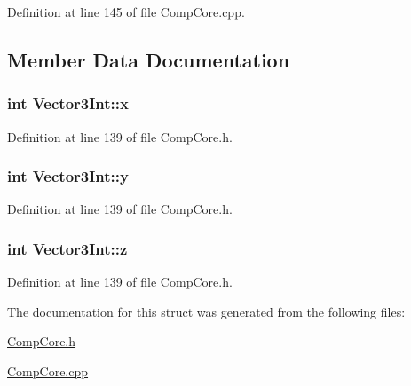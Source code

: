 Definition at line 145 of file Comp\-Core.\-cpp.



\subsection{Member Data Documentation}
\hypertarget{struct_vector3_int_a8d4ba1800a1912105d9089b54927b3cd}{
\subsubsection[{x}]{\setlength{\rightskip}{0pt plus 5cm}int Vector3\-Int\-::x}}\label{struct_vector3_int_a8d4ba1800a1912105d9089b54927b3cd}


Definition at line 139 of file Comp\-Core.\-h.

\hypertarget{struct_vector3_int_a6d6fcbb9ba302ed0dc3b7ac2752397b3}{
\subsubsection[{y}]{\setlength{\rightskip}{0pt plus 5cm}int Vector3\-Int\-::y}}\label{struct_vector3_int_a6d6fcbb9ba302ed0dc3b7ac2752397b3}


Definition at line 139 of file Comp\-Core.\-h.

\hypertarget{struct_vector3_int_aa19c7ce5f022b2188c75c23dbd07cb93}{
\subsubsection[{z}]{\setlength{\rightskip}{0pt plus 5cm}int Vector3\-Int\-::z}}\label{struct_vector3_int_aa19c7ce5f022b2188c75c23dbd07cb93}


Definition at line 139 of file Comp\-Core.\-h.



The documentation for this struct was generated from the following files\-:\begin{DoxyCompactItemize}
\item 
\hyperlink{_comp_core_8h}{Comp\-Core.\-h}\item 
\hyperlink{_comp_core_8cpp}{Comp\-Core.\-cpp}\end{DoxyCompactItemize}
